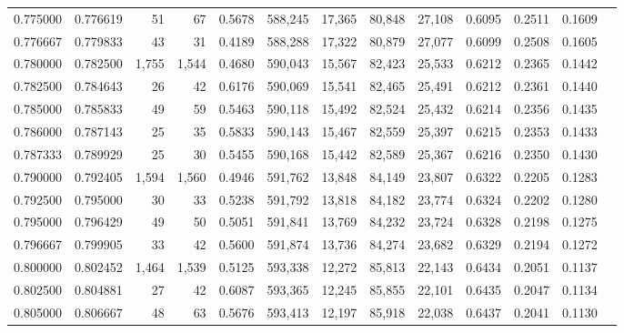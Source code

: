 \begin{tabular}{rrrrrrrrrrrrr}
0.775000 & 0.776619 &     51 &    67 &                                     0.5678 & 588,245 &  17,365 &  80,848 &  27,108 & 0.6095 & 0.2511 & 0.1609 \\
0.776667 & 0.779833 &     43 &    31 &                                     0.4189 & 588,288 &  17,322 &  80,879 &  27,077 & 0.6099 & 0.2508 & 0.1605 \\
0.780000 & 0.782500 &  1,755 & 1,544 &                                     0.4680 & 590,043 &  15,567 &  82,423 &  25,533 & 0.6212 & 0.2365 & 0.1442 \\
0.782500 & 0.784643 &     26 &    42 &                                     0.6176 & 590,069 &  15,541 &  82,465 &  25,491 & 0.6212 & 0.2361 & 0.1440 \\
0.785000 & 0.785833 &     49 &    59 &                                     0.5463 & 590,118 &  15,492 &  82,524 &  25,432 & 0.6214 & 0.2356 & 0.1435 \\
0.786000 & 0.787143 &     25 &    35 &                                     0.5833 & 590,143 &  15,467 &  82,559 &  25,397 & 0.6215 & 0.2353 & 0.1433 \\
0.787333 & 0.789929 &     25 &    30 &                                     0.5455 & 590,168 &  15,442 &  82,589 &  25,367 & 0.6216 & 0.2350 & 0.1430 \\
0.790000 & 0.792405 &  1,594 & 1,560 &                                     0.4946 & 591,762 &  13,848 &  84,149 &  23,807 & 0.6322 & 0.2205 & 0.1283 \\
0.792500 & 0.795000 &     30 &    33 &                                     0.5238 & 591,792 &  13,818 &  84,182 &  23,774 & 0.6324 & 0.2202 & 0.1280 \\
0.795000 & 0.796429 &     49 &    50 &                                     0.5051 & 591,841 &  13,769 &  84,232 &  23,724 & 0.6328 & 0.2198 & 0.1275 \\
0.796667 & 0.799905 &     33 &    42 &                                     0.5600 & 591,874 &  13,736 &  84,274 &  23,682 & 0.6329 & 0.2194 & 0.1272 \\
0.800000 & 0.802452 &  1,464 & 1,539 &                                     0.5125 & 593,338 &  12,272 &  85,813 &  22,143 & 0.6434 & 0.2051 & 0.1137 \\
0.802500 & 0.804881 &     27 &    42 &                                     0.6087 & 593,365 &  12,245 &  85,855 &  22,101 & 0.6435 & 0.2047 & 0.1134 \\
0.805000 & 0.806667 &     48 &    63 &                                     0.5676 & 593,413 &  12,197 &  85,918 &  22,038 & 0.6437 & 0.2041 & 0.1130 \\

\end{tabular}
